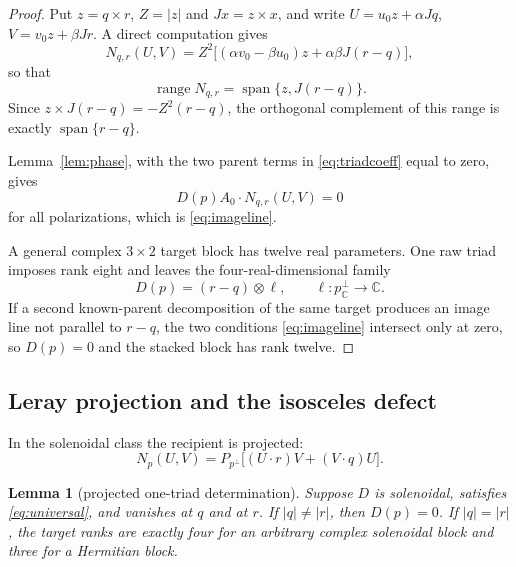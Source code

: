 \documentclass[11pt]{article}
\newtheorem{lemma}[theorem]{Lemma}
\theoremstyle{definition}
\theoremstyle{remark}
\theoremstyle{plain}
\DeclareMathOperator{\spn}{span}
\DeclareMathOperator{\range}{range}
\newcommand{\C}{\mathbb{C}}
\begin{document}
\begin{proof}
Put $z=q\times r$, $Z=|z|$ and $Jx=z\times x$, and write
$U=u_{0}z+\alpha Jq$, $V=v_{0}z+\beta Jr$. A direct computation gives
\begin{equation}
\label{eq:Nexplicit}
N_{q,r}(U,V)
=Z^{2}\bigl[(\alpha v_{0}-\beta u_{0})z+\alpha\beta J(r-q)\bigr],
\end{equation}
so that
\begin{equation}
\label{eq:Nrange}
\range N_{q,r}=\spn\{z,J(r-q)\} .
\end{equation}
Since $z\times J(r-q)=-Z^{2}(r-q)$, the orthogonal complement of this range is
exactly $\spn\{r-q\}$.

Lemma~\ref{lem:phase}, with the two parent terms in \eqref{eq:triadcoeff}
equal to zero, gives
\begin{equation}
\label{eq:rawconstraint}
D(p)A_{0}\cdot N_{q,r}(U,V)=0
\end{equation}
for all polarizations, which is \eqref{eq:imageline}.

A general complex $3\times2$ target block has twelve real parameters. One raw
triad imposes rank eight and leaves the four-real-dimensional family
\begin{equation}
\label{eq:residual}
D(p)=(r-q)\otimes\ell,
\qquad
\ell:p_{\C}^{\perp}\to\C .
\end{equation}
If a second known-parent decomposition of the same target produces an image
line not parallel to $r-q$, the two conditions \eqref{eq:imageline} intersect
only at zero, so $D(p)=0$ and the stacked block has rank twelve.
\end{proof}

\subsection{Leray projection and the isosceles defect}
\label{subsec:projected}

In the solenoidal class the recipient is projected:
\begin{equation}
\label{eq:projN}
N_{p}(U,V)=P_{p^{\perp}}\bigl[(U\cdot r)V+(V\cdot q)U\bigr].
\end{equation}

\begin{lemma}[projected one-triad determination]
\label{lem:projected}
Suppose $D$ is solenoidal, satisfies \eqref{eq:universal}, and vanishes at $q$
and at $r$. If $|q|\ne|r|$, then $D(p)=0$. If $|q|=|r|$, the target ranks are
exactly four for an arbitrary complex solenoidal block and three for a
Hermitian block.
\end{lemma}
\end{document}
